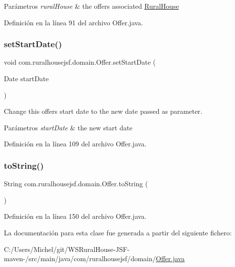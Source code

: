 \begin{DoxyParams}{Parámetros}
{\em rural\+House} & the offers associated \mbox{\hyperlink{classcom_1_1ruralhousejsf_1_1domain_1_1_rural_house}{Rural\+House}} \\
\hline
\end{DoxyParams}


Definición en la línea 91 del archivo Offer.\+java.

\mbox{\label{classcom_1_1ruralhousejsf_1_1domain_1_1_offer_ad829c57ed6d018c673d4fff942757ed4}} 
\subsubsection{\texorpdfstring{setStartDate()}{setStartDate()}}
{\footnotesize\ttfamily void com.\+ruralhousejsf.\+domain.\+Offer.\+set\+Start\+Date (\begin{DoxyParamCaption}\item[{Date}]{start\+Date }\end{DoxyParamCaption})}

Change this offers start date to the new date passed as parameter.


\begin{DoxyParams}{Parámetros}
{\em start\+Date} & the new start date \\
\hline
\end{DoxyParams}


Definición en la línea 109 del archivo Offer.\+java.

\mbox{\label{classcom_1_1ruralhousejsf_1_1domain_1_1_offer_a91920170708c786730b8707d51d5a810}} 
\subsubsection{\texorpdfstring{toString()}{toString()}}
{\footnotesize\ttfamily String com.\+ruralhousejsf.\+domain.\+Offer.\+to\+String (\begin{DoxyParamCaption}{ }\end{DoxyParamCaption})}



Definición en la línea 150 del archivo Offer.\+java.



La documentación para esta clase fue generada a partir del siguiente fichero\+:\begin{DoxyCompactItemize}
\item 
C\+:/\+Users/\+Michel/git/\+W\+S\+Rural\+House-\/\+J\+S\+F-\/maven-\//src/main/java/com/ruralhousejsf/domain/\mbox{\hyperlink{_offer_8java}{Offer.\+java}}\end{DoxyCompactItemize}
